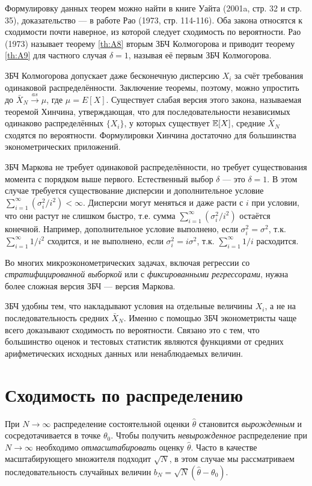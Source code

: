 Формулировку данных теорем можно найти в книге Уайта (2001a, стр. 32 и стр. 35), доказательство --- в работе Рао (1973, стр. 114-116). Оба закона относятся к сходимости почти наверное, из которой следует сходимость по вероятности. Рао (1973) называет теорему \ref{th:A8} вторым ЗБЧ Колмогорова и приводит теорему \ref{th:A9} для частного случая $\delta=1$, называя её первым ЗБЧ Колмогорова.

ЗБЧ Колмогорова допускает даже бесконечную дисперсию $X_i$ за счёт требования одинаковой распределённости. Заключение теоремы, поэтому, можно упростить до $\bar{X}_N \overset{as}{\to} \mu$, где $\mu=E[X]$. Существует слабая версия этого закона, называемая теоремой Хинчина, утверждающая, что для последовательности независимых одинаково распределённых $\{X_i\}$, у которых существует $\mathbb{E}[X]$, средние $\bar{X}_N$ сходятся по вероятности. Формулировки Хинчина достаточно для большинства эконометрических приложений.

ЗБЧ Маркова не требует одинаковой распределённости, но требует существования момента с порядком выше первого. Естественный выбор $\delta$ --- это $\delta=1$. В этом случае требуется существование дисперсии и дополнительное условие $\sum_{i=1}^{\infty} (\sigma^2_i/i^2) < \infty$. Дисперсии могут меняться и даже расти с $i$ при условии, что они растут не слишком быстро, т.е. сумма $\sum_{i=1}^{\infty} (\sigma^2_i/i^2)$ остаётся конечной. Например, дополнительное условие выполнено, если $\sigma^2_i=\sigma^2$, т.к. $\sum_{i=1}^{\infty} 1/i^2$ сходится, и не выполнено, если $\sigma^2_i=i\sigma^2$, т.к. $\sum_{i=1}^{\infty} 1/i$ расходится.

Во многих микроэконометрических задачах, включая регрессии со \textit{стратифицированной выборкой} или с \textit{фиксированными регрессорами}, нужна более сложная версия ЗБЧ --- версия Маркова.

ЗБЧ удобны тем, что накладывают условия на отдельные величины $X_i$, а не на последовательность средних $\bar{X}_N$. Именно с помощью ЗБЧ эконометристы чаще всего доказывают сходимость по вероятности. Связано это с тем, что большинство оценок и тестовых статистик являются функциями от средних арифметических исходных данных или ненаблюдаемых величин.

\section{Сходимость по распределению}

При $N\to\infty$ распределение состоятельной оценки $\hat{\theta}$ становится \textit{вырожденным} и сосредотачивается в точке $\theta_0$. Чтобы получить \textit{невырожденное} распределение при $N\to\infty$ необходимо \textit{отмасштабировать} оценку $\hat{\theta}$. Часто в качестве масштабирующего множителя подходит $\sqrt{N}$, в этом случае мы рассматриваем последовательность случайных величин $b_N=\sqrt{N}(\hat{\theta}-\theta_0)$.

